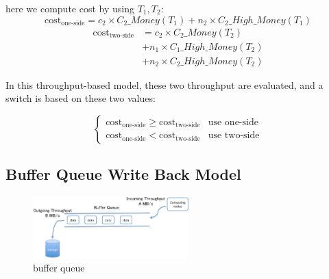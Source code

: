 here we compute cost by using $T_1,T_2$:
\begin{equation}
	\text{cost}_\text{one-side}=c_2\times C_2\_Money(T_1)+n_2\times C_2\_High\_Money(T_1)
\end{equation}
\begin{align}
	\text{cost}_\text{two-side}&=c_2\times C_2\_Money(T_2)\\\nonumber 
				     &+n_1\times C_1\_High\_Money(T_2)\\ \nonumber
				     &+n_2\times C_2\_High\_Money(T_2)
\end{align}

In this throughput-based model, these two throughput are evaluated, and a switch is based on these two values:

\begin{equation}
	\begin{cases}
		\text{cost}_{\text{one-side}} \geq \text{cost}_{\text{two-side}} & \text{use one-side}\\
		\text{cost}_{\text{one-side}} < \text{cost}_{\text{two-side}} & \text{use two-side}
	\end{cases}
\end{equation}

\subsection{Buffer Queue Write Back Model}

\begin{figure}[tb]
	\centering
	\includegraphics[width=6cm]{buffer_queue}
	\caption{buffer queue}
	\label{buffer queue}
\end{figure}

